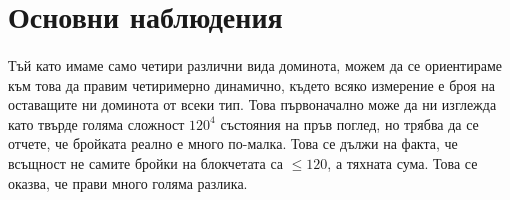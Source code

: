 \documentclass[12pt]{article}
\begin{document}
\section*{Основни наблюдения}
\paragraph*{}
Тъй като имаме само четири различни вида доминота, можем да се ориентираме към това да правим четиримерно динамично, където всяко измерение е броя на оставащите ни доминота от всеки тип. Това първоначално може да ни изглежда като твърде голяма сложност $120^4$ състояния на пръв поглед, но трябва да се отчете, че бройката реално е много по-малка. Това се дължи на факта, че всъщност не самите бройки на блокчетата са $\leq 120$, а тяхната сума. Това се оказва, че прави много голяма разлика.     
\end{document}
